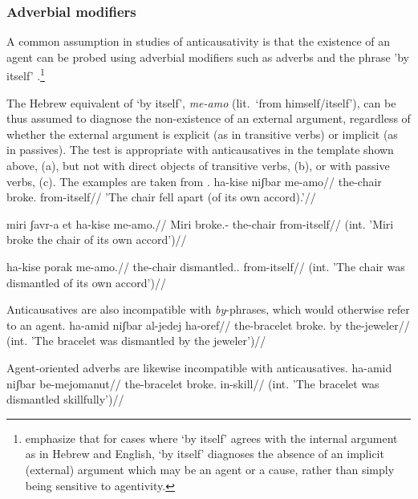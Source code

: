 {	\subsubsection{Adverbial modifiers} \label{vz:tnif:nact:adv}
A common assumption in studies of anticausativity is that the existence of an agent can be probed using adverbial modifiers such as adverbs and the phrase 'by itself' \citep{unaccusativity95,alexiadouanagnostopoulou04,layering15,alexiadoudoron12,koontzgarboden09,kastner17gjgl}.\footnote{\cite{layering15} emphasize that for cases where `by itself' agrees with the internal argument as in Hebrew and English, `by itself' diagnoses the absence of an implicit (external) argument which may be an agent or a cause, rather than simply being sensitive to agentivity.}

The Hebrew equivalent of `by itself', \emph{me-a{\ts}mo} (lit.~`from himself/itself'), can be thus assumed to diagnose the non-existence of an external argument, regardless of whether the external argument is explicit (as in transitive verbs) or implicit (as in passives). The test is appropriate with anticausatives in the {\tnif} template shown above, (\nextx a), but not with direct objects of transitive verbs, (\nextx b), or with passive verbs, (\nextx c). The examples are taken from \cite{ahdoutkastner18}.
\pex
	\a \begingl
	\gla ha-kise niʃbar me-a{\ts}mo//
      \glb the-chair broke. from-itself//
     \glft  'The chair fell apart (of its own accord).'//
    \endgl
    
    \a \ljudge{*} \begingl
    \gla miri ʃavr-a et ha-kise me-a{\ts}mo.//
    \glb Miri broke.-  the-chair from-itself//
    \glft (int. 'Miri broke the chair of its own accord')//
    \endgl
    
    \a \ljudge{*} \begingl
    \gla ha-kise porak me-a{\ts}mo.//
    \glb the-chair dismantled.. from-itself//
    \glft (int. 'The chair was dismantled of its own accord')//
   \endgl
\xe
    
Anticausatives are also incompatible with \emph{by}-phrases, which would otherwise refer to an agent.
\ex \ljudge{*} \begingl
	\gla ha-{\ts}amid niʃbar al-jedej ha-{\ts}oref//
	\glb the-bracelet broke. by the-jeweler//
	\glft (int. 'The bracelet was dismantled by the jeweler')//
	\endgl
\xe

Agent-oriented adverbs are likewise incompatible with anticausatives.
\ex \ljudge{*} \begingl
	\gla ha-{\ts}amid niʃbar be-mejomanut//
	\glb the-bracelet broke. in-skill//
	\glft (int. 'The bracelet was dismantled skillfully')//
	\endgl
\xe

}
